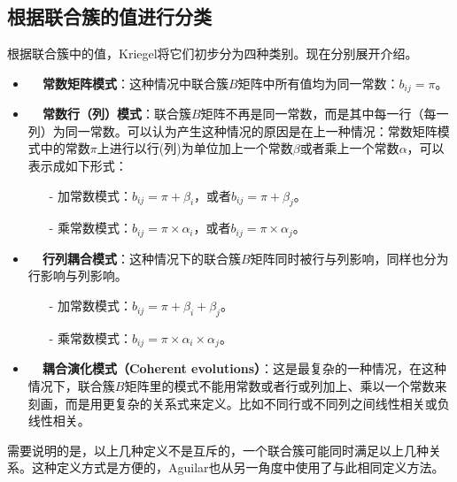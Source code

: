 \subsection{根据联合簇的值进行分类}
根据联合簇中的值，Kriegel将它们初步分为四种类别。现在分别展开介绍。
\begin{itemize}
  \item \textbf{~~常数矩阵模式}：这种情况中联合簇$B$矩阵中所有值均为同一常数：$b_{ij} = \pi$。
  \item \textbf{~~常数行（列）模式}：联合簇$B$矩阵不再是同一常数，而是其中每一行（每一列）为同一常数。可以认为产生这种情况的原因是在上一种情况：常数矩阵模式中的常数$\pi$上进行以行(列)为单位加上一个常数$\beta$或者乘上一个常数$\alpha$，可以表示成如下形式：

  \begin{itemize}
    \item[\qquad-] 加常数模式：$b_{ij}=\pi+\beta_i$，或者$b_{ij}=\pi+\beta_j$。
    \item[\qquad-] 乘常数模式：$b_{ij}=\pi\times\alpha_i$，或者$b_{ij}=\pi\times\alpha_j$。
  \end{itemize}

  \item \textbf{~~行列耦合模式}：这种情况下的联合簇$B$矩阵同时被行与列影响，同样也分为行影响与列影响。
    \begin{itemize}
      \item[\qquad-] 加常数模式：$b_{ij}=\pi+\beta_i+\beta_j$。
      \item[\qquad-] 乘常数模式：$b_{ij}=\pi\times\alpha_i\times\alpha_j$。
    \end{itemize}
  \item \textbf{~~耦合演化模式（Coherent evolutions）}：这是最复杂的一种情况，在这种情况下，联合簇$B$矩阵里的模式不能用常数或者行或列加上、乘以一个常数来刻画，而是用更复杂的关系式来定义。比如不同行或不同列之间线性相关或负线性相关。
\end{itemize}

需要说明的是，以上几种定义不是互斥的，一个联合簇可能同时满足以上几种关系。这种定义方式是方便的，Aguilar也从另一角度中使用了与此相同定义方法。

